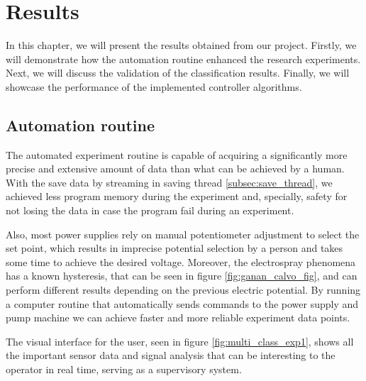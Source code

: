 \chapter{Results}
\label{chap:Results}

In this chapter, we will present the results obtained from our project. 
Firstly, we will demonstrate how the automation routine enhanced the research experiments. 
Next, we will discuss the validation of the classification results. 
Finally, we will showcase the performance of the implemented controller algorithms.

\section{Automation routine}
\label{sec:automation_routine}

The automated experiment routine is capable of acquiring a significantly more precise and extensive amount of data than what can be achieved by a human. 
With the save data by streaming in saving thread \ref{subsec:save_thread}, we achieved less program memory during the experiment and, specially, safety for not losing the data in case the program fail during an experiment.

Also, most power supplies rely on manual potentiometer adjustment to select the set point, which results in imprecise potential selection by a person and takes some time to achieve the desired voltage.
Moreover, the electrospray phenomena has a known hysteresis, that can be seen in figure \ref{fig:ganan_calvo_fig}, and can perform different results depending on the previous electric potential.
By running a computer routine that automatically sends commands to the power supply and pump machine we can achieve faster and more reliable experiment data points.

The visual interface for the user, seen in figure \ref{fig:multi_class_exp1}, shows all the important sensor data and signal analysis that can be interesting to the operator in real time, serving as a supervisory system.


